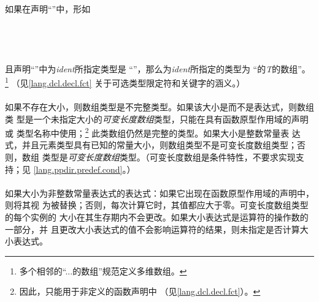 {\paragraph{}
如果在声明``''中，形如                                        \\
\mbox{\hspace{4em}\tm{D[}  \tm{]}}                                    \\
\mbox{\hspace{4em}\tm{D[static}  \tm{]}}                                              \\
\mbox{\hspace{4em}\tm{D[}  
   \tm{]}}                                          \\
\mbox{\hspace{4em}\tm{D[}  \tm{*]}}         \\
且声明``''中为\textit{ident}所指定类型是
``''，那么为\textit{ident}所指定的类型为
``的\textit{T}的数组''。
\footnote{多个相邻的``...的数组''规范定义多维数组。} （见\ref{lang.dcl.decl.fct}
关于可选类型限定符和关键字的涵义。）

\paragraph{}
如果不存在大小，则数组类型是不完整类型。如果该大小是\tm{*}而不是表达式，则数组类
型是一个未指定大小的\textit{可变长度数组}类型，只能在具有函数原型作用域的声明或
类型名称中使用；\footnote{因此，\tm{*}只能用于非定义的函数声明中
（见\ref{lang.dcl.decl.fct}）。} 此类数组仍然是完整的类型。如果大小是整数常量表
达式，并且元素类型具有已知的常量大小，则数组类型不是可变长度数组类型；否则，数组
类型是\textit{可变长度数组}类型。（可变长度数组是条件特性，不要求实现支持；见
\ref{lang.ppdir.predef.cond}。）

\paragraph{}
如果大小为非整数常量表达式的表达式：如果它出现在函数原型作用域的声明中，则将其视
为被\tm{*}替换；否则，每次计算它时，其值都应大于零。可变长度数组类型的每个实例的
大小在其生存期内不会更改。如果大小表达式是运算符的操作数的一部分，并
且更改大小表达式的值不会影响运算符的结果，则未指定是否计算大小表达式。

}
